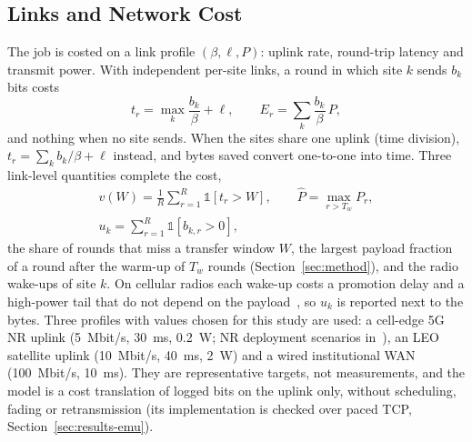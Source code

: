 \subsection{Links and Network Cost}
\label{sec:netmodel}
The job is costed on a link profile $(\beta,\ell,P)$: uplink rate, round-trip latency and transmit power. With independent per-site links, a round in which site $k$ sends $b_k$ bits costs
\begin{equation}
t_r=\max_k\frac{b_k}{\beta}+\ell,\qquad E_r=\sum_k\frac{b_k}{\beta}\,P,
\label{eq:netcost}
\end{equation}
and nothing when no site sends. When the sites share one uplink (time division), $t_r=\sum_kb_k/\beta+\ell$ instead, and bytes saved convert one-to-one into time. Three link-level quantities complete the cost,
\begin{equation}
\begin{gathered}
v(W)=\frac1R\sum_{r=1}^R\mathbb 1[t_r>W],\qquad \hat P=\max_{r>T_w}P_r,\\
u_k=\sum_{r=1}^R\mathbb 1[b_{k,r}>0],
\end{gathered}
\label{eq:netmetrics}
\end{equation}
the share of rounds that miss a transfer window $W$, the largest payload fraction of a round after the warm-up of $T_w$ rounds (Section~\ref{sec:method}), and the radio wake-ups of site $k$. On cellular radios each wake-up costs a promotion delay and a high-power tail that do not depend on the payload~\cite{huang2012lte,narayanan2021variegated}, so $u_k$ is reported next to the bytes. Three profiles with values chosen for this study are used: a cell-edge 5G NR uplink (5~Mbit/s, 30~ms, 0.2~W; NR deployment scenarios in~\cite{tr38913}), an LEO satellite uplink (10~Mbit/s, 40~ms, 2~W) and a wired institutional WAN (100~Mbit/s, 10~ms). They are representative targets, not measurements, and the model is a cost translation of logged bits on the uplink only, without scheduling, fading or retransmission (its implementation is checked over paced TCP, Section~\ref{sec:results-emu}).

